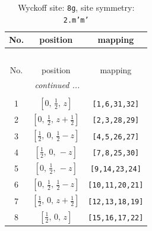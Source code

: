 \documentclass[fleqn,8pt]{jsarticle}
\begin{document}
\renewcommand{\arraystretch}{1.2}
\begin{longtable}{ccc}
\caption{Wyckoff site: {\tt 8g}, site symmetry: {\tt 2.m'm'}}
 \\
 \hline \hline
No. & position & mapping \\ \hline \endfirsthead

\multicolumn{2}{l}{\tablename\ \thetable{}} \\
 \hline \hline
No. & position & mapping \\ \hline \endhead

 \hline \hline
\multicolumn{2}{r}{\footnotesize\it continued ...} \\ \endfoot

 \hline \hline
\multicolumn{2}{r}{} \\ \endlastfoot

1 & $\left[ 0,\, \frac{1}{2},\, z \right]$ & {\tt [1,6,31,32]} \\ \hline
2 & $\left[ 0,\, \frac{1}{2},\, z + \frac{1}{2} \right]$ & {\tt [2,3,28,29]} \\ \hline
3 & $\left[ \frac{1}{2},\, 0,\, \frac{1}{2} - z \right]$ & {\tt [4,5,26,27]} \\ \hline
4 & $\left[ \frac{1}{2},\, 0,\, - z \right]$ & {\tt [7,8,25,30]} \\ \hline
5 & $\left[ 0,\, \frac{1}{2},\, - z \right]$ & {\tt [9,14,23,24]} \\ \hline
6 & $\left[ 0,\, \frac{1}{2},\, \frac{1}{2} - z \right]$ & {\tt [10,11,20,21]} \\ \hline
7 & $\left[ \frac{1}{2},\, 0,\, z + \frac{1}{2} \right]$ & {\tt [12,13,18,19]} \\ \hline
8 & $\left[ \frac{1}{2},\, 0,\, z \right]$ & {\tt [15,16,17,22]} \\
\end{longtable}
\renewcommand{\arraystretch}{1.2}
\end{document}
